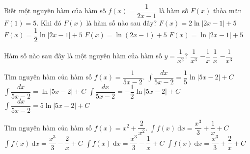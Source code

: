 

\begin{ex}%
	Biết một nguyên hàm của hàm số $f(x)=\dfrac{1}{2x-1}$ là hàm  số $F(x)$ thỏa mãn $F(1)=5$. Khi đó $F(x)$ là hàm số nào sau đây?
	\choice 
		 {$F(x)=2\ln|2x-1|+5$}
		 {\True $F(x)=\dfrac{1}{2} \ln|2x-1|+5$}
		{$F(x)=\ln(2x-1)+5$} 
		{$F(x)=\ln|2x-1|+5$} 
\end{ex}

\begin{ex}%
	Hàm  số nào sau đây là một nguyên hàm của hàm số $y=\dfrac{1}{x^2}$?
	\choice 
		 {$\dfrac{1}{x^3}$}
		 {\True $-\dfrac{1}{x}$}
		 {$\dfrac{1}{x}$}
		{$-\dfrac{1}{x^3}$} 
\end{ex}

\begin{ex}%
	Tìm nguyên hàm của  hàm số $f(x)=\dfrac{1}{5x-2}$.
	\choice 
		{\True  $\displaystyle\int \dfrac{d x}{5x-2}=\dfrac{1}{5} \ln|5x-2|+C$}
		{$\displaystyle\int  \dfrac{d x}{5x-2}=\ln|5x-2|+C$}
		{$\displaystyle\int  \dfrac{d x}{5x-2}=-\dfrac{1}{2} \ln|5x-2|+C$}
		{$\displaystyle\int \dfrac{d  x}{5x-2}=5\ln|5x-2|+C$}
\end{ex}

\begin{ex}%
	Tìm nguyên hàm của  hàm số $f(x)=x^2+\dfrac{2}{x^2}$.
	\choice 
		{$\displaystyle\int f(x)\mathrm{~d} x=\dfrac{x^3}{3}+\dfrac{1}{x}+C$} 
		{\True $\displaystyle\int  f(x)\mathrm{~d} x=\dfrac{x^3}{3}-\dfrac{2}{x}+C$}
		 {$\displaystyle\int f(x)\mathrm{~d} x=\dfrac{x^3}{3}-\dfrac{1}{x}+C$}
		{$\displaystyle\int  f(x)\mathrm{~d} x=\dfrac{x^3}{3}+\dfrac{2}{x}+C$}
\end{ex}


